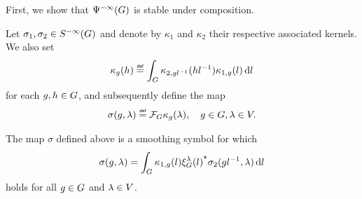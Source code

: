 First, we show that ${\Psi^{-\infty} (G)}$ is stable under composition.

\begin{lemma}
    Let $\sigma_1, \sigma_2 \in {S^{-\infty} (G)}$
    and denote by $\kappa_1$ and $\kappa_2$ their respective associated kernels.
    We also set
    \begin{align*}
        \kappa_g(h) \defeq \int_\Group \kappa_{2, g l^{-1}}(h l^{-1}) \kappa_{1, g}(l) \dd l
    \end{align*}
    for each $g, h \in G$,
    and subsequently define the map
    \begin{align*}
        \sigma(g, \lambda) \defeq \Fourier \kappa_g(\lambda),
        \quad g \in \Group, \lambda \in \VectorSpace.
    \end{align*}

    The map $\sigma$ defined above is a smoothing symbol for which
    \begin{align}
        \sigma(g, \lambda) = \int_G \kappa_{1, g}(l) {\xi^{\lambda}_{G}(l)}^\star \sigma_2(g l^{-1}, \lambda) \,\mathrm{d} l
        \label{eq:formal_expression_for_the_symbol_obtained_by_composition}
    \end{align}
    holds for all $g \in G$ and $\lambda \in V$.
\end{lemma}

